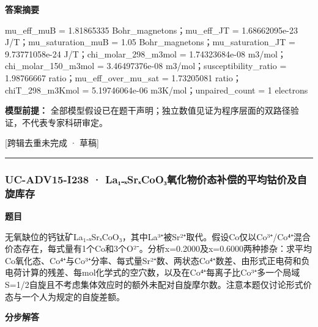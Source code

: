 \documentclass[UTF8,11pt,a4paper]{ctexart}
\begin{document}
\noindent\textbf{答案摘要}\par
mu\_eff\_muB = 1.81865335 Bohr\_magnetons；mu\_eff\_JT = 1.68662095e-23 J/T；mu\_saturation\_muB = 1.05 Bohr\_magnetons；mu\_saturation\_JT = 9.73771058e-24 J/T；chi\_molar\_298\_m3mol = 1.74323684e-08 m3/mol；chi\_molar\_150\_m3mol = 3.46497376e-08 m3/mol；susceptibility\_ratio = 1.98766667 ratio；mu\_eff\_over\_mu\_sat = 1.73205081 ratio；chiT\_298\_m3Kmol = 5.19746064e-06 m3K/mol；unpaired\_count = 1 electrons\par
\noindent\textbf{模型前提：}
全部模型假设已在题干声明；独立数值见证为程序层面的双路径验证，不代表专家科研审定。\par
\noindent\textcolor{red!65!black}{[跨辑去重未完成 · 草稿]} \par
\medskip\hrule\medskip
{}
\subsubsection*{UC-ADV15-I238 · La₁₋ₓSrₓCoO₃氧化物价态补偿的平均钴价及自旋库存}
\noindent\textbf{题目}\par
无氧缺位的钙钛矿La₁₋ₓSrₓCoO₃，其中La³⁺被Sr²⁺取代。假设Co仅以Co³⁺/Co⁴⁺混合价态存在，每式量有1个Co和3个O²⁻。分析x=0.2000及x=0.6000两种掺杂：求平均Co氧化态、Co⁴⁺与Co³⁺分率、每式量Sr²⁺数、两状态Co⁴⁺数差、由形式正电荷和负电荷计算的残差、每mol化学式的空穴数，以及在Co⁴⁺每离子比Co³⁺多一个局域S=1/2自旋且不考虑集体效应时的额外未配对自旋摩尔数。注意本题仅讨论形式价态与一个人为规定的自旋差额。\par
\medskip\noindent\textbf{分步解答}
\end{document}
